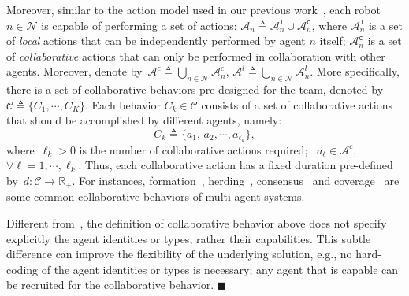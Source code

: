 Moreover, similar to the action model used in our previous work~\cite{guo2016task},
each robot $n\in \mathcal{N}$ is capable of performing a set of actions:
$\mathcal{A}_n\triangleq \mathcal{A}^{\texttt{l}}_n \cup \mathcal{A}^{\texttt{c}}_n$,
where $\mathcal{A}^{\texttt{l}}_n$ is a set of \emph{local} actions that can be independently performed by agent $n$ itself;
$\mathcal{A}^{\texttt{c}}_n$ is a set of \emph{collaborative} actions that can only be performed
in collaboration with other agents.
Moreover, denote by~$\mathcal{A}^c\triangleq\bigcup_{n\in\mathcal{N}}\mathcal{A}^c_n$,
$\mathcal{A}^l\triangleq\bigcup_{n\in\mathcal{N}}\mathcal{A}^l_n$.
More specifically,
there is a set of collaborative behaviors pre-designed for the team,
denoted by~$\mathcal{C}\triangleq \{C_1,\cdots, C_K\}$. 
Each behavior $C_k\in \mathcal{C}$ consists of a set of collaborative actions
that should be accomplished by different agents, namely:
\begin{equation}\label{eq:c-k}
C_k\triangleq \{a_1,\,a_2,\cdots,a_{\ell_k}\},
\end{equation}
where~$\ell_k>0$ is the number of collaborative actions required;
~$a_{\ell}\in \mathcal{A}^c$, $\forall \ell=1,\cdots,\ell_k$.
Thus, each collaborative action has a fixed duration pre-defined by~$d:\mathcal{C}\rightarrow \mathbb{R}_{+}$.
For instances, formation~\cite{chen2005formation}, herding~\cite{pan2007multi},
 consensus~\cite{li2009consensus} and coverage~\cite{mesbahi2010graph}
 are some common collaborative behaviors of multi-agent systems.



\begin{remark}\label{rm:collaborative}
Different from~\cite{luo2021temporal,sahin2019multirobot, jones2019scratchs},
the definition of collaborative behavior above does not specify explicitly
the agent identities or {types}, rather their capabilities.
This subtle difference can improve the flexibility of the underlying solution,
e.g.,  no hard-coding of the agent identities or types is necessary;
any agent that is capable can be recruited for the collaborative behavior.
\hfill $\blacksquare$
\end{remark}



